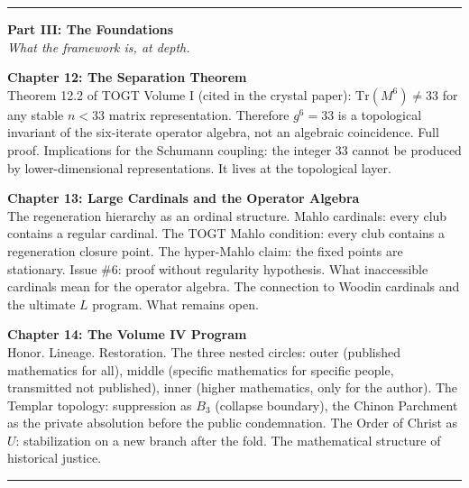 \documentclass[12pt, oneside]{book}
\begin{document}
\vspace{0.5cm}
\hrule
\vspace{0.5cm}


\noindent\textbf{Part III: The Foundations}\\
\textit{What the framework is, at depth.}

\medskip
\noindent\textbf{Chapter 12: The Separation Theorem}\\
Theorem 12.2 of TOGT Volume I (cited in the crystal paper):
$\mathrm{Tr}(M^6) \neq 33$ for any stable $n < 33$ matrix
representation. Therefore $g^6 = 33$ is a topological invariant
of the six-iterate operator algebra, not an algebraic coincidence.
Full proof. Implications for the Schumann coupling: the integer
33 cannot be produced by lower-dimensional representations.
It lives at the topological layer.

\medskip
\noindent\textbf{Chapter 13: Large Cardinals and the Operator Algebra}\\
The regeneration hierarchy as an ordinal structure.
Mahlo cardinals: every club contains a regular cardinal.
The TOGT Mahlo condition: every club contains a regeneration
closure point. The hyper-Mahlo claim: the fixed points are
stationary. Issue \#6: proof without regularity hypothesis.
What inaccessible cardinals mean for the operator algebra.
The connection to Woodin cardinals and the ultimate $L$ program.
What remains open.

\medskip
\noindent\textbf{Chapter 14: The Volume IV Program}\\
Honor. Lineage. Restoration. The three nested circles:
outer (published mathematics for all), middle (specific
mathematics for specific people, transmitted not published),
inner (higher mathematics, only for the author).
The Templar topology: suppression as $B_3$ (collapse boundary),
the Chinon Parchment as the private absolution before the
public condemnation. The Order of Christ as $U$: stabilization
on a new branch after the fold.
The mathematical structure of historical justice.

\vspace{0.5cm}
\hrule
\vspace{0.5cm}

\end{document}

